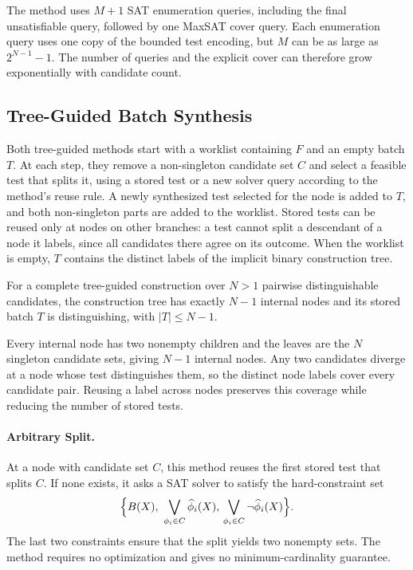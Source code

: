 \documentclass[runningheads]{llncs}
\newcommand{\methodname}[1]{\textup{\textsf{#1}}}
\newcommand{\arbitrarysplit}{\methodname{Arbitrary Split}}
\begin{document}
The method uses $M+1$ SAT enumeration queries, including the final
unsatisfiable query, followed by one MaxSAT
cover query. Each enumeration query uses one copy of the bounded test
encoding, but $M$ can be as large as $2^{N-1}-1$. The number of queries and
the explicit cover can therefore grow exponentially with candidate count.

\subsection{Tree-Guided Batch Synthesis}
\label{sec:tree-guided-synthesis}

Both tree-guided methods start with a worklist containing $F$ and an empty
batch $T$. At each step, they remove a non-singleton candidate set $C$ and
select a feasible test that splits it, using a stored test or a new solver
query according to the method's reuse rule. A newly synthesized test selected
for the node is added to $T$, and both non-singleton parts are added to the
worklist. Stored tests can be reused only at nodes on other branches: a test
cannot split a descendant of a node it labels, since all candidates there
agree on its outcome. When the worklist is empty, $T$ contains the distinct
labels of the implicit binary construction tree.

\begin{proposition}
\label{prop:materialization}
For a complete tree-guided construction over $N>1$ pairwise distinguishable
candidates, the construction tree has exactly $N-1$ internal nodes and its
stored batch $T$ is distinguishing, with $|T|\leq N-1$.
\end{proposition}

Every internal node has two nonempty children and the leaves are the $N$
singleton candidate sets, giving $N-1$ internal nodes. Any two candidates
diverge at a node whose test distinguishes them, so the distinct node labels
cover every candidate pair. Reusing a label across nodes preserves this
coverage while reducing the number of stored tests.

\paragraph{\arbitrarysplit{}.}
At a node with candidate set $C$, this method reuses the first stored test
that splits $C$. If none exists, it asks a SAT solver to satisfy the
hard-constraint set
\begin{equation}
\label{eq:arbitrary-split}
  \Bigl\{B(X),\ \bigvee_{\phi_i\in C}\widehat{\phi}_i(X),\,
    \bigvee_{\phi_i\in C}\neg\widehat{\phi}_i(X)\Bigr\}.
\end{equation}
The last two constraints ensure that the split yields two nonempty sets. The method requires no optimization and gives no
minimum-cardinality guarantee.
\end{document}
